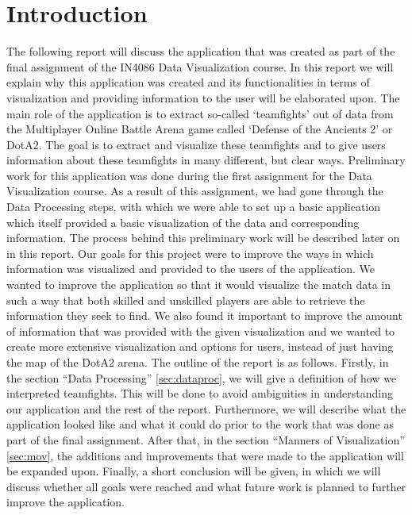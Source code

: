 \documentclass[11pt,twoside,a4paper]{article}
\begin{document}
\section*{Introduction}
The following report will discuss the application that was created as part of the final assignment of the IN4086 Data Visualization course. In this report we will explain why this application was created and its functionalities in terms of visualization and providing information to the user will be elaborated upon.
\newline\newline
The main role of the application is to extract so-called `teamfights' out of data from the Multiplayer Online Battle Arena game called `Defense of the Ancients 2' or DotA2. The goal is to extract and visualize these teamfights and to give users information about these teamfights in many different, but clear ways.
\newline\newline
Preliminary work for this application was done during the first assignment for the Data Visualization course. As a result of this assignment, we had gone through the Data Processing steps, with which we were able to set up a basic application which itself provided a basic visualization of the data and corresponding information. The process behind this preliminary work will be described later on in this report.
\newline\newline
Our goals for this project were to improve the ways in which information was visualized and provided to the users of the application. We wanted to improve the application so that it would visualize the match data in such a way that both skilled and unskilled players are able to retrieve the information they seek to find. We also found it important to improve the amount of information that was provided with the given visualization and we wanted to create more extensive visualization and options for users, instead of just having the map of the DotA2 arena.
\newline\newline
The outline of the report is as follows. Firstly, in the section ``Data Processing'' \ref{sec:dataproc}, we will give a definition of how we interpreted teamfights. This will be done to avoid ambiguities in understanding our application and the rest of the report. Furthermore, we will describe what the application looked like and what it could do prior to the work that was done as part of the final assignment. After that, in the section ``Manners of Visualization'' \ref{sec:mov}, the additions and improvements that were made to the application will be expanded upon. Finally, a short conclusion will be given, in which we will discuss whether all goals were reached and what future work is planned to further improve the application.
\end{document}
